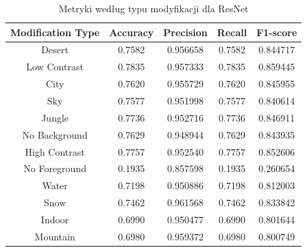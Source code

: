 \begin{table}
    \centering
    \begin{tabular}{|c|c|c|c|c|}
        \hline
        \textbf{Modification Type} & \textbf{Accuracy} & \textbf{Precision} & \textbf{Recall} & \textbf{F1-score} \\
        \hline
        Desert & 0.7582 & 0.956658 & 0.7582 & 0.844717 \\
        \hline
        Low Contrast & 0.7835 & 0.957333 & 0.7835 & 0.859445 \\
        \hline
        City & 0.7620 & 0.955729 & 0.7620 & 0.845955 \\
        \hline
        Sky & 0.7577 & 0.951998 & 0.7577 & 0.840614 \\
        \hline
        Jungle & 0.7736 & 0.952716 & 0.7736 & 0.846911 \\
        \hline
        No Background & 0.7629 & 0.948944 & 0.7629 & 0.843935 \\
        \hline
        High Contrast & 0.7757 & 0.952540 & 0.7757 & 0.852606 \\
        \hline
        No Foreground & 0.1935 & 0.857598 & 0.1935 & 0.260654 \\
        \hline
        Water & 0.7198 & 0.950886 & 0.7198 & 0.812003 \\
        \hline
        Snow & 0.7462 & 0.961568 & 0.7462 & 0.833842 \\
        \hline
        Indoor & 0.6990 & 0.950477 & 0.6990 & 0.801644 \\
        \hline
        Mountain & 0.6980 & 0.959372 & 0.6980 & 0.800749 \\
        \hline
    \end{tabular}
    \caption{Metryki według typu modyfikacji dla ResNet}
    \label{tab:resnet_metrics_modification}
\end{table}

